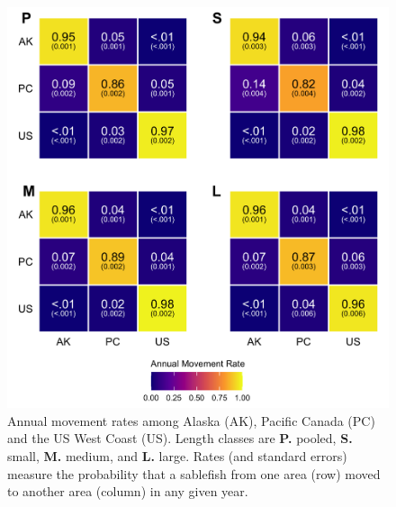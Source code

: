 \documentclass{article}
\begin{document}
\begin{figure}[htb]
    \centering
    \includegraphics[width = 5in]{figs/heat-movement-03a-static}
    \caption{Annual movement rates among Alaska (AK), Pacific Canada (PC) and the US West Coast (US). Length classes are \textbf{P.} pooled, \textbf{S.} small, \textbf{M.} medium, and \textbf{L.} large. Rates (and standard errors) measure the probability that a sablefish from one area (row) moved to another area (column) in any given year.}
    \label{fig:heat-movement-03a-static}
\end{figure}
\end{document}
